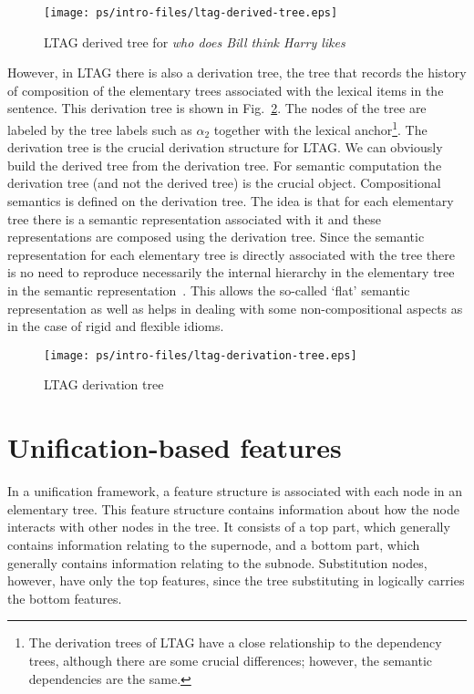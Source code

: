 \begin{figure*}[ht] 
\begin{center}
\texttt{[image: ps/intro-files/ltag-derived-tree.eps]}
\caption{\label{derived-tree} LTAG derived tree for {\it who does Bill think Harry likes}}
\end{center}
\end{figure*}


However, in LTAG there is also a derivation tree, the tree that
records the history of composition of the elementary trees associated
with the lexical items in the sentence. This derivation tree is shown
in Fig.~\ref{ltag-derivation-tree}. The nodes of the tree are labeled
by the tree labels such as $\alpha_2$ together with the lexical
anchor\footnote{The derivation trees of LTAG have a close relationship
to the dependency trees, although there are some crucial differences;
however, the semantic dependencies are the same.}.  The derivation
tree is the crucial derivation structure for LTAG. We can obviously
build the derived tree from the derivation tree. For semantic
computation the derivation tree (and not the derived tree) is the
crucial object. Compositional semantics is defined on the derivation
tree. The idea is that for each elementary tree there is a semantic
representation associated with it and these representations are
composed using the derivation tree. Since the semantic representation
for each elementary tree is directly associated with the tree there is
no need to reproduce necessarily the internal hierarchy in the
elementary tree in the semantic
representation~\cite{joshi99:_compos_ltag}. This allows the so-called
`flat' semantic representation as well as helps in dealing with some
non-compositional aspects as in the case of rigid and flexible idioms.


\begin{figure*}[ht] 
\begin{center}
\texttt{[image: ps/intro-files/ltag-derivation-tree.eps]}
\caption{\label{ltag-derivation-tree} LTAG derivation tree}
\end{center}
\end{figure*}

\section{Unification-based features}

In a unification framework, a feature structure is associated with each node in
an elementary tree.  This feature structure contains information about how the
node interacts with other nodes in the tree.  It consists of a top part, which
generally contains information relating to the supernode, and a bottom part,
which generally contains information relating to the subnode.  Substitution
nodes, however, have only the top features, since the tree substituting in
logically carries the bottom features.

